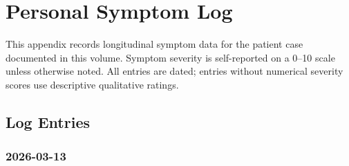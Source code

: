 
\section{Personal Symptom Log}
\label{sec:appendix-i-personal-symptoms}

This appendix records longitudinal symptom data for the patient case documented in this
volume. Symptom severity is self-reported on a 0--10 scale unless otherwise noted.
All entries are dated; entries without numerical severity scores use descriptive
qualitative ratings.

\subsection*{Log Entries}

\subsubsection*{2026-03-13}
\label{sym:2026-03-13}


